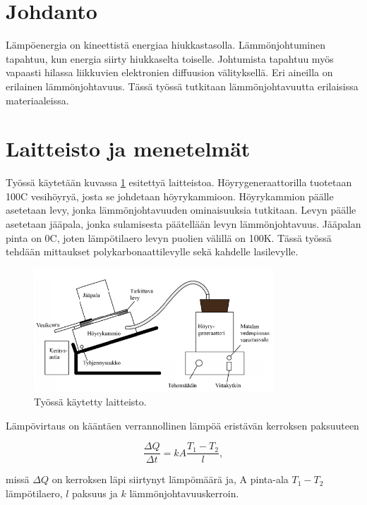 \documentclass[a4paper,11pt]{article}
\begin{document}
\section{Johdanto}

Lämpöenergia on kineettistä energiaa hiukkastasolla. Lämmönjohtuminen tapahtuu, kun energia siirty hiukkaselta toiselle. Johtumista tapahtuu myös vapaasti hilassa liikkuvien elektronien diffuusion välityksellä. Eri aineilla on erilainen lämmönjohtavuus. Tässä työssä tutkitaan lämmönjohtavuutta erilaisissa materiaaleissa. \cite{wiki:thermal}

\section{Laitteisto ja menetelmät}

Työssä käytetään kuvassa \ref{laitteisto} esitettyä laitteistoa. Höyrygeneraattorilla tuotetaan 100\degree C vesihöyryä, josta se johdetaan höyrykammioon. Höyrykammion päälle asetetaan levy, jonka lämmönjohtavuuden ominaisuuksia tutkitaan. Levyn päälle asetetaan jääpala, jonka sulamisesta päätellään levyn lämmönjohtavuus. Jääpalan pinta on 0\degree C, joten lämpötilaero levyn puolien välillä on 100K. Tässä työssä tehdään mittaukset polykarbonaattilevylle sekä kahdelle lasilevylle. 

\begin{figure}[H]
\centering \includegraphics[width=0.8\textwidth]{laitteisto}
\caption{Työssä käytetty laitteisto. \label{laitteisto}}
\end{figure}

Lämpövirtaus on kääntäen verrannollinen lämpöä eristävän kerroksen paksuuteen

\begin{equation}
  \frac{\Delta Q}{\Delta t} = k A \frac{T_1 - T_2}{l} ,
\end{equation}

missä $\Delta Q$ on kerroksen läpi siirtynyt lämpömäärä ja, A pinta-ala $T_1 - T_2$ lämpötilaero, $l$ paksuus ja $k$ lämmönjohtavuuskerroin. 
\end{document}
